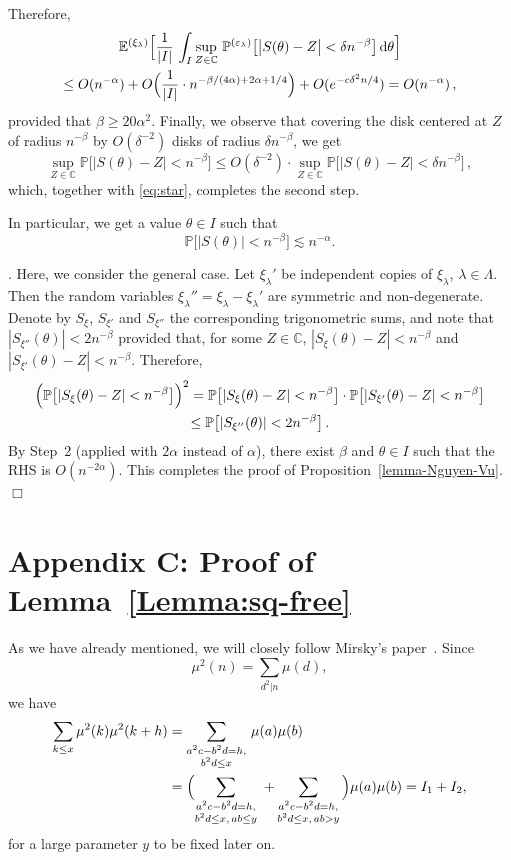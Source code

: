 \documentclass[11pt]{amsart}
\numberwithin{equation}{section}
\def\ep{{\varepsilon}}
\newcommand{\bC}{\mathbb C}
\newcommand{\bP}{\mathbb P}
\newcommand{\bE}{\mathbb E}
\begin{document}
Therefore,
\begin{multline*}
\bE^{(\xi_\lambda)}\Bigl[
\frac1{|I|}\,
\int_I  \sup_{Z\in\bC}\,  \bP^{(\ep_\lambda)}\bigl[ \bigl| S(\theta) - Z \bigr|
< \delta n^{-\beta} \bigr]\, {\rm d}\theta \Bigr] \\
\le
O(n^{-\alpha}) + O\Bigl(\frac1{|I|}\cdot n^{-\beta/(4\alpha) + 2\alpha + 1/4}\Bigr) + O(e^{-c\delta^2 n/4})
= O(n^{-\alpha})\,,
\end{multline*}
provided that $\beta\ge 20\alpha^2$.
Finally, we observe that
covering the disk centered at $Z$ of radius $n^{-\beta}$ by $O(\delta^{-2})$
disks of radius $\delta n^{-\beta}$, we get
\[
\sup_{Z\in\bC} \bP \bigl[ |S(\theta) - Z| < n^{-\beta} \bigr]
\le O(\delta^{-2}) \cdot \sup_{Z\in\bC} \bP \bigl[ |S(\theta) - Z| < \delta n^{-\beta} \bigr]\,,
\]
which, together with \eqref{eq:star}, completes the second step.

\medskip 
In particular, we get a value $\theta\in I$ such that
\[
\bP \bigl[ |S(\theta)| < n^{-\beta} \bigr]
\lesssim n^{-\alpha}.
\]

\medskip{}.
Here, we consider the general case. Let $\xi_\lambda'$ be independent copies of $\xi_\lambda$,
$\lambda\in\Lambda$. Then the random variables $\xi_\lambda'' = \xi_\lambda - \xi_\lambda'$
are symmetric and non-degenerate. Denote by $S_\xi$, $S_{\xi'}$ and $S_{\xi''}$ the corresponding
trigonometric sums, and note that
$|S_{\xi''}(\theta)| < 2n^{-\beta}$ provided that, for some $Z\in\bC$,
$|S_{\xi}(\theta)-Z| < n^{-\beta}$ and $|S_{\xi'}(\theta)-Z| < n^{-\beta}$.
Therefore,
\begin{multline*}
\Bigl( \bP \bigl[ |S_{\xi}(\theta)-Z| < n^{-\beta} \bigr] \Bigr)^2
= \bP \bigl[ |S_{\xi}(\theta)-Z| < n^{-\beta} \bigr] \cdot
\bP \bigl[ |S_{\xi'}(\theta)-Z| < n^{-\beta} \bigr] \\
\le \bP \bigl[ |S_{\xi''}(\theta)| < 2n^{-\beta} \bigr]\,.
\end{multline*}
By Step~2 (applied with $2\alpha$ instead of $\alpha$),
there exist $\beta$ and $\theta\in I$ such that the RHS is $O(n^{-2\alpha})$. This completes the proof of Proposition~\ref{lemma-Nguyen-Vu}.
\hfill $\Box$

\section*{Appendix C: Proof of Lemma~\ref{Lemma:sq-free}}
\renewcommand{\theequation}{C.\arabic{equation}}
\setcounter{equation}{0}

As we have already mentioned, we will closely follow Mirsky's paper~\cite{Mirsky}.
Since
$$
\mu^2(n)=\sum_{d^2|n}\mu(d),
$$
we have
\begin{align*}
\sum_{k\le x}\mu^2(k) \mu^2(k+h)
&=\sum_{\substack{a^2c-b^2d=h,\\ b^2d\le x}}\, \mu(a)\mu(b)\\
&=
\Bigl( \sum_{\substack{a^2c-b^2d=h, \\
b^2d\le x,\,ab\le y}} \
+ \sum_{\substack{a^2c-b^2d=h,\\
b^2d\le x,\, ab>y}}\, \Bigr) \mu(a)\mu(b)=I_1+I_2,
\end{align*}
for a large parameter $y$ to be fixed later on.
\end{document}
